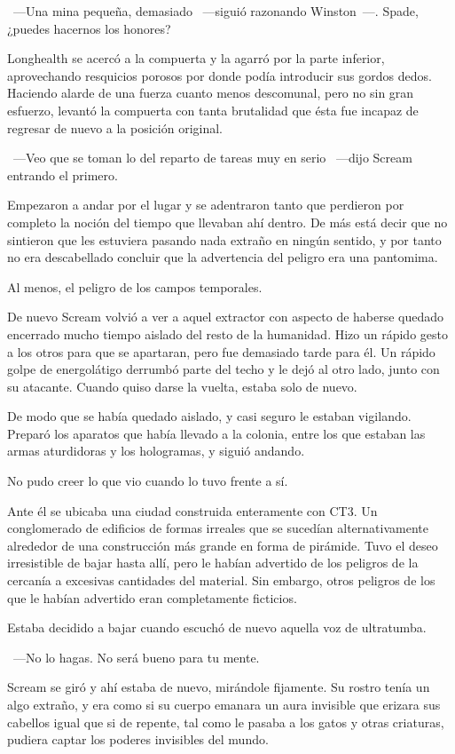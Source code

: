 ~---Una mina pequeña, demasiado ~---siguió razonando Winston~---. Spade, ¿puedes hacernos los honores?

Longhealth se acercó a la compuerta y la agarró por la parte inferior, aprovechando resquicios porosos por donde podía introducir sus gordos dedos. Haciendo alarde de una fuerza cuanto menos descomunal, pero no sin gran esfuerzo, levantó la compuerta con tanta brutalidad que ésta fue incapaz de regresar de nuevo a la posición original.

~---Veo que se toman lo del reparto de tareas muy en serio ~---dijo Scream entrando el primero.

Empezaron a andar por el lugar y se adentraron tanto que perdieron por completo la noción del tiempo que llevaban ahí dentro. De más está decir que no sintieron que les estuviera pasando nada extraño en ningún sentido, y por tanto no era descabellado concluir que la advertencia del peligro era una pantomima.

Al menos, el peligro de los campos temporales.

De nuevo Scream volvió a ver a aquel extractor con aspecto de haberse quedado encerrado mucho tiempo aislado del resto de la humanidad. Hizo un rápido gesto a los otros para que se apartaran, pero fue demasiado tarde para él. Un rápido golpe de energolátigo derrumbó parte del techo y le dejó al otro lado, junto con su atacante. Cuando quiso darse la vuelta, estaba solo de nuevo.

De modo que se había quedado aislado, y casi seguro le estaban vigilando. Preparó los aparatos que había llevado a la colonia, entre los que estaban las armas aturdidoras y los hologramas, y siguió andando.

No pudo creer lo que vio cuando lo tuvo frente a sí.

Ante él se ubicaba una ciudad construida enteramente con CT3. Un conglomerado de edificios de formas irreales que se sucedían alternativamente alrededor de una construcción más grande en forma de pirámide. Tuvo el deseo irresistible de bajar hasta allí, pero le habían advertido de los peligros de la cercanía a excesivas cantidades del material. Sin embargo, otros peligros de los que le habían advertido eran completamente ficticios.

Estaba decidido a bajar cuando escuchó de nuevo aquella voz de ultratumba.

~---No lo hagas. No será bueno para tu mente.

Scream se giró y ahí estaba de nuevo, mirándole fijamente. Su rostro tenía un algo extraño, y era como si su cuerpo emanara un aura invisible que erizara sus cabellos igual que si de repente, tal como le pasaba a los gatos y otras criaturas, pudiera captar los poderes invisibles del mundo.

